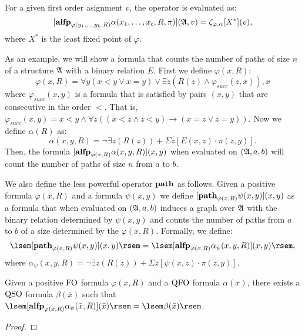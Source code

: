 For a given first order asignment $v$, the operator is evaluated as:
$$
[\textbf{alfp}_{\varphi(y_1,\ldots,y_k,R)}\alpha(x_1,\ldots,x_{\ell},R,\pi)](\mathfrak{A},v) = \zeta_{\varphi,\alpha}[X^*](v),
$$
where $X^*$ is the least fixed point of $\varphi$.

As an example, we will show a formula that counts the number of paths of size $n$ of a structure $\mathfrak{A}$ with a binary relation $E$. First we define $\varphi(x,R)$:
$$
\varphi(x,R) = \forall y(x < y \vee x = y) \vee \exists z(R(z) \wedge \varphi_{succ}(z,x)),x
$$
where $\varphi_{succ}(x,y)$ is a formula that is satisfied by pairs $(x,y)$ that are consecutive in the order $<$. That is, $\varphi_{succ}(x,y) = x < y \wedge \forall z((x < z \wedge z < y) \to (x = z \vee z = y) )$. Now we define $\alpha(R)$ as:
$$
\alpha(x,y,R) = \neg \exists z(R(z)) + \Sigma z[E(x,z)\cdot \pi(z,y)].
$$
Then, the formula $[{\bf alfp}_{\varphi(x,R)} \alpha(x,y,R)](x,y)$ when evaluated on $(\mathfrak{A},a,b)$ will count the number of paths of size $n$ from $a$ to $b$.

We also define the less powerful operator ${\bf path}$ as follows. Given a positive formula $\varphi(x,R)$ and a formula $\psi(x,y)$ we define $[{\bf path}_{\varphi(x,R)} \psi(x,y)](x,y)$ as a formula that when evaluated on $(\mathfrak{A}, a, b)$ induces a graph over $\mathfrak{A}$ with the binary relation determined by $\psi(x,y)$ and counts the number of paths from $a$ to $b$ of a size determined by the $\varphi(x,R)$. Formally, we define:
$$
\sem{[\pth_{\varphi(x,R)} \psi(x,y)](x,y)} = \sem{[\alfp_{\varphi(x,R)} \alpha_{\psi}(x,y,R)](x,y)},
$$
where $\alpha_{\psi}(x,y,R) = \neg \exists z(R(z)) + \Sigma z[\psi(x,z)\cdot \pi(z,y)]$.


\begin{theorem}
	Given a positive ${\rm FO}$ formula $\varphi(\bar{x},R)$ and a ${\rm QFO}$ formula $\alpha(\bar{x})$, there exists a ${\rm QSO}$ formula $\beta(\bar{x})$ such that $\sem{[\alfp_{\varphi(\bar{x},R)} \alpha_{\psi}(\bar{x},R)](\bar{x})} = \sem{\beta(\bar{x})}$.
\end{theorem}
\begin{proof}
	
\end{proof}

